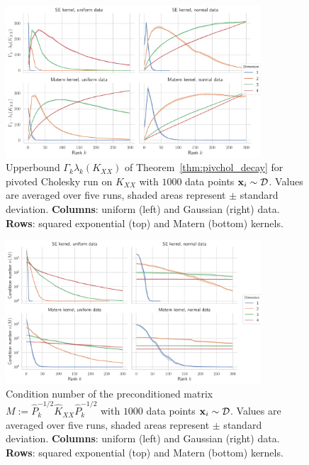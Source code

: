 \documentclass{article}
\begin{document}
{\begin{figure}
    \centering
    \includegraphics[width=0.85\textwidth]{report/res/pivchol_upperbound.pdf}
    \caption{Upperbound $\Gamma_k \lambda_k(K_{XX})$ of Theorem~\ref{thm:pivchol_decay} for pivoted Cholesky run on $K_{XX}$ with $1000$ data points $\boldsymbol{\mathbf{x}}_i \sim \mathcal D$. Values are averaged over five runs, shaded areas represent $\pm$ standard deviation. \textbf{Columns}: uniform (left) and Gaussian (right) data. \textbf{Rows}: squared exponential (top) and Matern (bottom) kernels. }
    \label{fig:pivchol_upperbound}
\end{figure}

\begin{figure}
    \centering
    \includegraphics[width=0.85\textwidth]{report/res/pivchol_cond.pdf}
    \caption{Condition number of the preconditioned matrix $M := \widehat P^{-1/2}_k \widehat K_{XX} \widehat P^{-1/2}_k$ with $1000$ data points $\boldsymbol{\mathbf{x}}_i \sim \mathcal D$. Values are averaged over five runs, shaded areas represent $\pm$ standard deviation. \textbf{Columns}: uniform (left) and Gaussian (right) data. \textbf{Rows}: squared exponential (top) and Matern (bottom) kernels. }
    \label{fig:pivchol_cond}
\end{figure}




}
\end{document}

